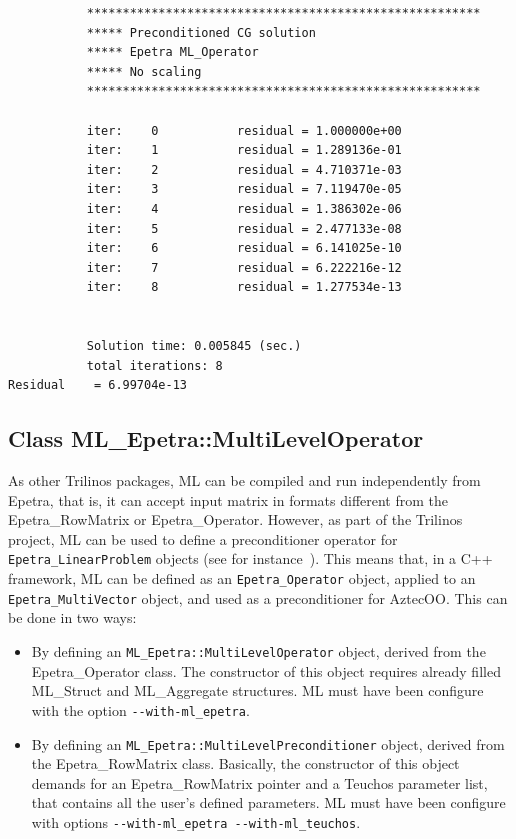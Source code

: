 \begin{verbatim}
           *******************************************************
           ***** Preconditioned CG solution
           ***** Epetra ML_Operator
           ***** No scaling
           *******************************************************

           iter:    0           residual = 1.000000e+00
           iter:    1           residual = 1.289136e-01
           iter:    2           residual = 4.710371e-03
           iter:    3           residual = 7.119470e-05
           iter:    4           residual = 1.386302e-06
           iter:    5           residual = 2.477133e-08
           iter:    6           residual = 6.141025e-10
           iter:    7           residual = 6.222216e-12
           iter:    8           residual = 1.277534e-13


           Solution time: 0.005845 (sec.)
           total iterations: 8
Residual    = 6.99704e-13
\end{verbatim}


\subsection{Class ML\_Epetra::MultiLevelOperator}
\label{sec:ml:Operator}

As other Trilinos packages, ML can be compiled and run independently
from Epetra, that is, it can accept input matrix in formats different
from the Epetra\_RowMatrix or Epetra\_Operator. However, as part of the
Trilinos project, ML can be used to define a preconditioner operator for
\verb!Epetra_LinearProblem! objects (see for
instance~\cite{Epetra-Ref-Guide}). This means that, in a C++ framework,
ML can be defined as an \verb!Epetra_Operator! object, applied to an
\verb!Epetra_MultiVector!  object, and used as a preconditioner for
AztecOO.  This can be done in two ways:
\begin{itemize}
\item By defining an \verb!ML_Epetra::MultiLevelOperator! object, derived from the
  Epetra\_Operator class. The constructor of this object requires
  already filled ML\_Struct and ML\_Aggregate structures.  ML must have
  been configure with the option \verb!--with-ml_epetra!.
\item By defining an \verb!ML_Epetra::MultiLevelPreconditioner! object, derived
  from the Epetra\_RowMatrix class. Basically, the constructor of
  this object demands for an Epetra\_RowMatrix  pointer and a
  Teuchos parameter list, that contains all the user's defined
  parameters. ML must have been configure with options
  \verb!--with-ml_epetra --with-ml_teuchos!.
\end{itemize}

